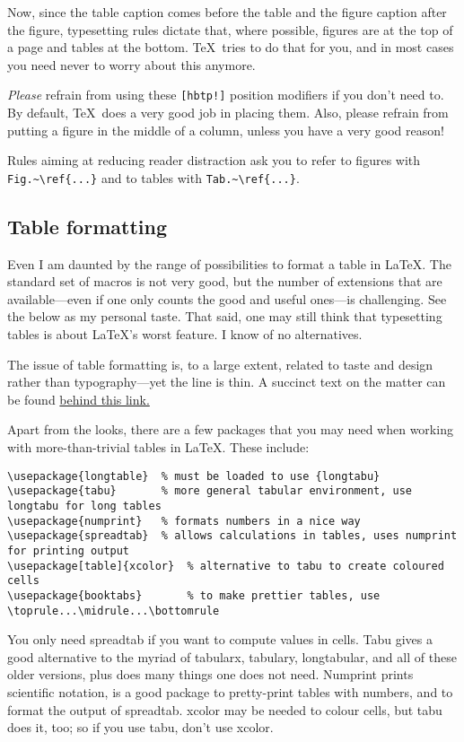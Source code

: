 \documentclass{article}
\begin{document}
Now, since the table caption comes before the table and the figure caption after the figure, typesetting rules dictate that, where possible, figures are at the top of a page and tables at the bottom.  \TeX\ tries to do that for you, and in most cases you need never to worry about this anymore.

\textsl{Please} refrain from using these \verb+[hbtp!]+ position modifiers if you don't need to.  By default, \TeX\ does a very good job in placing them.  Also, please refrain from putting a figure in the middle of a column, unless you have a very good reason!

Rules aiming at reducing reader distraction ask you to refer to figures with \verb+Fig.~\ref{...}+ and to tables with \verb+Tab.~\ref{...}+.

\subsection{Table formatting}
Even I am daunted by the range of possibilities to format a table in \LaTeX. The standard set of macros is not very good, but the number of extensions that are available---even if one only counts the good and useful ones---is challenging. See the below as my personal taste.  That said, one may still think that typesetting tables is about \LaTeX's worst feature.  I know of no alternatives.

The issue of table formatting is, to a large extent, related to taste and design rather than typography---yet the line is thin.  A succinct text on the matter can be found \href{http://users.ece.cmu.edu/~pueschel/teaching/guides/guide-tables.pdf}{behind this link.}

Apart from the looks, there are a few packages that you may need when working with more-than-trivial tables in \LaTeX.  These include:
\begin{verbatim}
\usepackage{longtable}	% must be loaded to use {longtabu}
\usepackage{tabu}		% more general tabular environment, use longtabu for long tables
\usepackage{numprint}	% formats numbers in a nice way
\usepackage{spreadtab}	% allows calculations in tables, uses numprint for printing output
\usepackage[table]{xcolor}	% alternative to tabu to create coloured cells
\usepackage{booktabs}		% to make prettier tables, use \toprule...\midrule...\bottomrule
\end{verbatim}
You only need spreadtab if you want to compute values in cells.  Tabu gives a good alternative to the myriad of tabularx, tabulary, longtabular, and all of these older versions, plus does many things one does not need.  Numprint prints scientific notation, is a good package to pretty-print tables with numbers, and to format the output of spreadtab.  xcolor may be needed to colour cells, but tabu does it, too; so if you use tabu, don't use xcolor.
\end{document}
